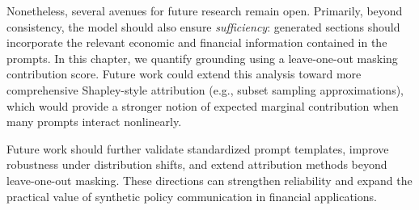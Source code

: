 Nonetheless, several avenues for future research remain open. Primarily, beyond consistency, the model should also ensure \textit{sufficiency}: generated sections should incorporate the relevant economic and financial information contained in the prompts. In this chapter, we quantify grounding using a leave-one-out masking contribution score. Future work could extend this analysis toward more comprehensive Shapley-style attribution (e.g., subset sampling approximations), which would provide a stronger notion of expected marginal contribution when many prompts interact nonlinearly.

%
Future work should further validate standardized prompt templates, improve robustness under distribution shifts, and extend attribution methods beyond leave-one-out masking. These directions can strengthen reliability and expand the practical value of synthetic policy communication in financial applications.

